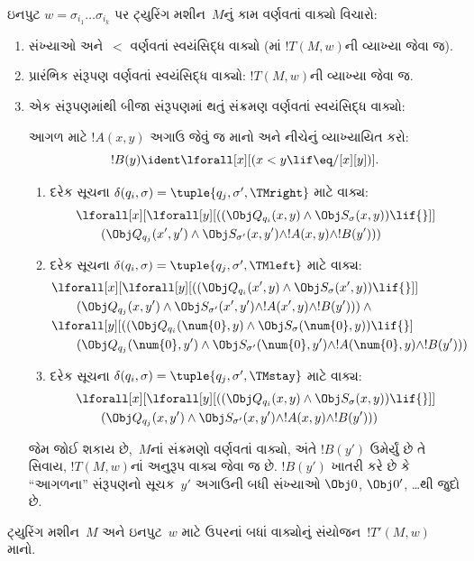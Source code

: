 ઇનપુટ $w = \sigma_{i_1}\dots\sigma_{i_k}$ પર
ટ્યુરિંગ મશીન~$M$નું કામ વર્ણવતાં વાક્યો
વિચારો:
\begin{enumerate}
\item સંખ્યાઓ અને~$<$ વર્ણવતાં સ્વયંસિદ્ધ વાક્યો
  (માં $!T(M,w)$ની વ્યાખ્યા જેવા જ).
\item પ્રારંભિક સંરૂપણ વર્ણવતાં સ્વયંસિદ્ધ વાક્યો:
  $!T(M,w)$ની વ્યાખ્યા જેવા જ.
\item એક સંરૂપણમાંથી બીજા સંરૂપણમાં થતું સંક્રમણ
  વર્ણવતાં સ્વયંસિદ્ધ વાક્યો:

આગળ માટે $!A(x, y)$ અગાઉ જેવું જ માનો અને
નીચેનું વ્યાખ્યાયિત કરો:
\[
  !B(y) \ident \lforall[x][(x < y \lif \eq/[x][y])].
\]
\begin{enumerate}
\item {} દરેક સૂચના
  $\delta(q_i, \sigma) =
  \tuple{q_j, \sigma', \TMright}$ માટે વાક્ય:
\begin{align*}
& \lforall[x][\lforall[y][(
   (\Obj Q_{q_i}(x, y) \land \Obj S_{\sigma}(x, y)) \lif {}]] \\
&\qquad   (\Obj Q_{q_j}(x', y') \land \Obj S_{\sigma'}(x, y') \land
!A(x, y) \land !B(y')))
\end{align*}
\item {} દરેક સૂચના
  $\delta(q_i, \sigma) =
  \tuple{q_j, \sigma', \TMleft}$ માટે વાક્ય:
\begin{align*}
& \lforall[x][\lforall[y][
    ((\Obj Q_{q_i}(x', y) \land \Obj S_{\sigma}(x', y)) \lif {}]]\\
& \qquad   (\Obj Q_{q_j}(x, y') \land \Obj S_{\sigma'}(x', y') \land
!A(x', y) \land !B(y'))) \land {}\\
& \lforall[y][((\Obj Q_{q_i}(\num{0}, y) \land \Obj S_{\sigma}(\num{0},
    y)) \lif {}]\\
& \qquad (\Obj Q_{q_j}(\num{0}, y') \land \Obj S_{\sigma'}(\num{0},
  y') \land !A(\num{0}, y) \land !B(y')))
\end{align*}
\item {} દરેક સૂચના
  $\delta(q_i, \sigma) =
  \tuple{q_j, \sigma', \TMstay}$ માટે વાક્ય:
\begin{align*}
& \lforall[x][\lforall[y][(
   (\Obj Q_{q_i}(x, y) \land \Obj S_{\sigma}(x, y)) \lif {}]] \\
&\qquad (\Obj Q_{q_j}(x, y') \land \Obj S_{\sigma'}(x, y') \land
!A(x, y) \land !B(y')))
\end{align*}
\end{enumerate}
જેમ જોઈ શકાય છે,~$M$નાં સંક્રમણો વર્ણવતાં
વાક્યો, અંતે $!B(y')$ ઉમેર્યું છે તે સિવાય,
$!T(M,w)$નાં અનુરૂપ વાક્ય જેવા જ છે.
$!B(y')$ ખાતરી કરે છે કે ``આગળના'' સંરૂપણનો
સૂચક~$y'$ અગાઉની બધી સંખ્યાઓ
$\Obj 0$, $\Obj 0'$, \dots{}થી જુદો છે.
\end{enumerate}
ટ્યુરિંગ મશીન~$M$ અને ઇનપુટ~$w$ માટે ઉપરનાં
બધાં વાક્યોનું સંયોજન~$!T'(M, w)$ માનો.

